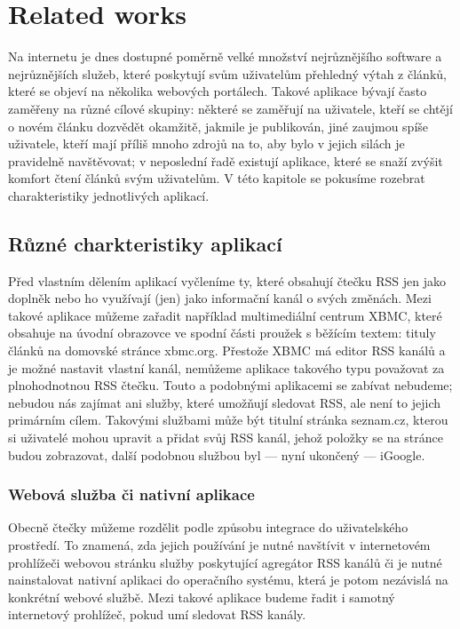 \chapter{Related works}


Na internetu je dnes dostupné poměrně velké množství nejrůznějšího software a nejrůznějších služeb, které poskytují svům uživatelům přehledný výtah z článků, které se objeví na několika webových portálech.
Takové aplikace bývají často zaměřeny na různé cílové skupiny: některé se zaměřují na uživatele, kteří se chtějí o novém článku dozvědět okamžitě, jakmile je publikován, jiné zaujmou spíše uživatele, kteří mají příliš mnoho zdrojů na to, aby bylo v jejich silách je pravidelně navštěvovat; v neposlední řadě existují aplikace, které se snaží zvýšit komfort čtení článků svým uživatelům.
V této kapitole se pokusíme rozebrat charakteristiky jednotlivých aplikací.

\section{Různé charkteristiky aplikací}

Před vlastním dělením aplikací vyčleníme ty, které obsahují čtečku RSS jen jako doplněk nebo ho využívají (jen) jako informační kanál o svých změnách.
Mezi takové aplikace můžeme zařadit například multimediální centrum XBMC, které obsahuje na úvodní obrazovce ve spodní části proužek s běžícím textem: tituly článků na domovské stránce xbmc.org.
Přestože XBMC má editor RSS kanálů a je možné nastavit vlastní kanál, nemůžeme aplikace takového typu považovat za plnohodnotnou RSS čtečku.
Touto a podobnými aplikacemi se zabívat nebudeme; nebudou nás zajímat ani služby, které umožňují sledovat RSS, ale není to jejich primárním cílem.
Takovými službami může být titulní stránka seznam.cz, kterou si uživatelé mohou upravit a přidat svůj RSS kanál, jehož položky se na stránce budou zobrazovat, další podobnou službou byl --- nyní ukončený --- iGoogle.

\subsection{Webová služba či nativní aplikace}


Obecně čtečky můžeme rozdělit podle způsobu integrace do uživatelského prostředí.
To znamená, zda jejich používání je nutné navštívit v internetovém prohlížeči webovou stránku služby poskytující agregátor RSS kanálů či je nutné nainstalovat nativní aplikaci do operačního systému, která je potom nezávislá na konkrétní webové službě.
Mezi takové aplikace budeme řadit i samotný internetový prohlížeč, pokud umí sledovat RSS kanály.

